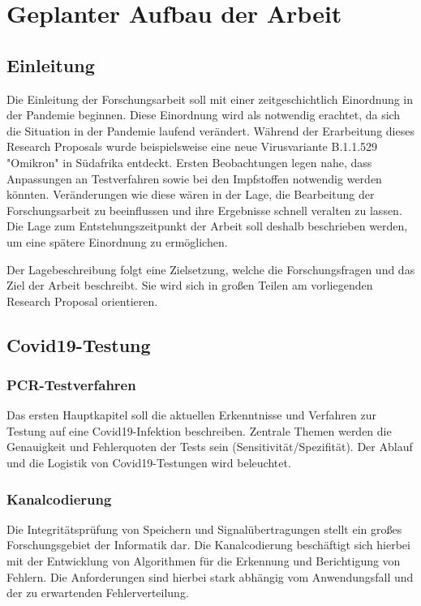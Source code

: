 
\chapter{Geplanter Aufbau der Arbeit}
\section{Einleitung}
Die Einleitung der Forschungsarbeit soll mit einer zeitgeschichtlich Einordnung in der Pandemie beginnen.
Diese Einordnung wird als notwendig erachtet, da sich die Situation in der Pandemie laufend verändert.
Während der Erarbeitung dieses Research Proposals wurde beispielsweise eine neue Virusvariante B.1.1.529 "Omikron" in Südafrika entdeckt.
Ersten Beobachtungen legen nahe, dass Anpassungen an Testverfahren sowie bei den Impfstoffen notwendig werden könnten.
Veränderungen wie diese wären in der Lage, die Bearbeitung der Forschungsarbeit zu beeinflussen und ihre Ergebnisse schnell veralten zu lassen.
Die Lage zum Entstehungszeitpunkt der Arbeit soll deshalb beschrieben werden, um eine spätere Einordnung zu ermöglichen.

Der Lagebeschreibung folgt eine Zielsetzung, welche die Forschungsfragen und das Ziel der Arbeit beschreibt.
Sie wird sich in großen Teilen am vorliegenden Research Proposal orientieren.

\section{Covid19-Testung}
\subsection{PCR-Testverfahren}
Das ersten Hauptkapitel soll die aktuellen Erkenntnisse und Verfahren zur Testung auf eine Covid19-Infektion beschreiben.
Zentrale Themen werden die Genauigkeit und Fehlerquoten der Tests sein (Sensitivität/Spezifität).
Der Ablauf und die Logistik von Covid19-Testungen wird beleuchtet.

\subsection{Kanalcodierung}
Die Integritätsprüfung von Speichern und Signalübertragungen stellt ein großes Forschungsgebiet der Informatik dar.
Die Kanalcodierung beschäftigt sich hierbei mit der Entwicklung von Algorithmen für die Erkennung und Berichtigung von Fehlern.
Die Anforderungen sind hierbei stark abhängig vom Anwendungsfall und der zu erwartenden Fehlerverteilung.

